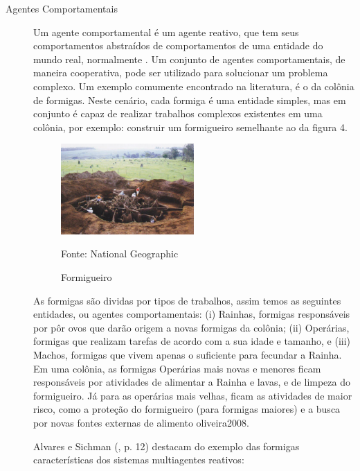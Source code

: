 \begin{description}
\item[Agentes Comportamentais ]

Um agente comportamental é um agente reativo, que tem seus comportamentos abstraídos de comportamentos de uma entidade do mundo real, normalmente \cite[p. 33]{oliveira2008}. Um conjunto de agentes comportamentais, de maneira cooperativa, pode ser utilizado para solucionar um problema complexo. Um exemplo comumente encontrado na literatura, é o da colônia de formigas. Neste cenário, cada formiga é uma entidade simples, mas em conjunto é capaz de realizar trabalhos complexos existentes em uma colônia, por exemplo: construir um formigueiro semelhante ao da figura 4.

\begin{figure}[h!]
\centering
\label{f02}
\includegraphics[width=0.5\textwidth]{figuras/f02}
\caption{Formigueiro} {Fonte: National Geographic}

\end{figure}

As formigas são dividas por tipos de trabalhos, assim temos as seguintes entidades, ou agentes comportamentais: (i) Rainhas, formigas responsáveis por pôr ovos que darão origem a novas formigas da colônia; (ii) Operárias, formigas que realizam tarefas de acordo com a sua idade e tamanho, e (iii) Machos, formigas que vivem apenas o suficiente para fecundar a Rainha. Em uma colônia, as formigas Operárias mais novas e menores ficam responsáveis por atividades de alimentar a Rainha e lavas, e de limpeza do formigueiro. Já para as operárias mais velhas, ficam as atividades de maior risco, como a proteção do formigueiro (para formigas maiores) e a busca por novas fontes externas de alimento  {oliveira2008}.

Alvares e Sichman (\citeyear{alvares1997}, p. 12) destacam do exemplo das formigas características dos sistemas multiagentes reativos:

\begin{citacao}
\begin{enumerate}


\end{enumerate}
\end{citacao}
\end{description}
